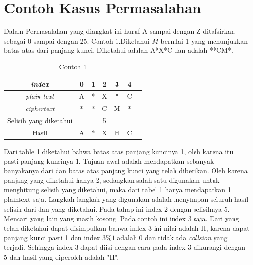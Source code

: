 	\section{Contoh Kasus Permasalahan}
	Dalam Permasalahan yang diangkat ini huruf A sampai dengan Z ditafsirkan sebagai 0 sampai dengan 25.
	Contoh 1.Diketahui $M$ bernilai 1 yang menunjukkan batas atas dari panjang kunci. Diketahui \plaintext adalah A*X*C dan \ciphertext adalah **CM*. 
	\begin{table}[H]
	 	\centering
	 	\begin{tabular}{|c|c|c|c|c|c|c|}\hline
	 	\textit{index}&0&1&2&3&4\\ \hline
	 	\textit{plain text}&A&*&X&*&C\\ \hline
	 	\textit{ciphertext}&*&*&C&M&*\\ \hline
	 	Selisih yang diketahui& & &5& & \\ \hline
	 	Hasil              &A&*&X&H&C\\ \hline
	 	\end{tabular}
	 	\caption{Contoh 1}
	 	\label{tab:contoh1}
	\end{table}
	 Dari table \ref{tab:contoh1} diketahui bahwa batas atas panjang kuncinya 1, oleh karena itu pasti panjang kuncinya 1. Tujuan awal adalah mendapatkan \plaintext sebanyak banyakanya dari \ciphertext dan batas atas panjang kunci yang telah diberikan. Oleh karena panjang \ciphertext yang diketahui hanya 2, sedangkan salah satu \ciphertext digunakan untuk menghitung selisih yang diketahui, maka dari tabel \ref{tab:contoh1} hanya mendapatkan 1 plaintext saja. Langkah-langkah yang digunakan adalah menyimpan seluruh hasil selisih dari \plaintext dan \ciphertext yang diketahui. Pada tahap ini index 2 dengan selisihnya 5. Mencari \ciphertext yang lain yang \plaintext masih kosong. Pada contoh ini index 3 saja. Dari yang telah diketahui dapat disimpulkan bahwa index 3 ini nilai \plaintext adalah H, karena dapat panjang kunci pasti 1 dan index $3\%1$ adalah 0 dan tidak ada \textit{collsion} yang terjadi. Sehingga index 3 dapat diisi dengan cara \ciphertext pada index 3 dikurangi dengan 5 dan hasil yang diperoleh adalah "H".
	 
	 
	 
